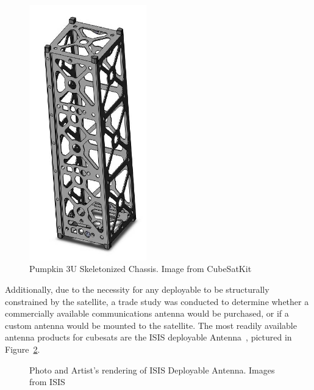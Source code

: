 \documentclass[12pt]{article}
\begin{document}
\begin{figure}[!ht]
\centering
\includegraphics[width=2in]{images/STR-1.jpg}
\caption{Pumpkin 3U Skeletonized Chassis. Image from CubeSatKit\cite{cubesatkit}}
\label{fig:str-1}
\end{figure}

Additionally, due to the necessity for any deployable to be structurally constrained by the satellite, a trade study was conducted to determine whether a commercially available communications antenna would be purchased, or if a custom antenna would be mounted to the satellite. The most readily available antenna products for cubesats are the ISIS deployable Antenna~\cite{cubesatshop}, pictured in Figure~\ref{fig:str-2-3}.

\begin{figure}[!ht]
\hfill
{}
\hfill
{}
\hfill
\caption{Photo and Artist’s rendering of ISIS Deployable Antenna. Images from ISIS~\cite{isis-image}}
\label{fig:str-2-3}
\end{figure}
\end{document}
